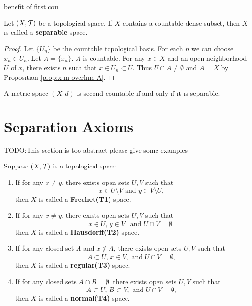 benefit of first cou

\begin{definition}[Separability]
    Let $(X,\mathcal{T})$ be a topological space. If $X$ contains a countable dense subset, then $X$ is called a \textbf{separable} space.
\end{definition}

\begin{theorem}
    
\end{theorem}
\begin{proof}
    Let $\{U_n\}$ be the countable topological basis. For each $n$ we can choose $x_n\in U_n$. Let $A=\{x_n\}$. $A$ is countable.
    For any $x\in X$ and an open neighborhood $U$ of $x$, there exists $n$ such that $x\in U_n\subset U$. Thus $U\cap A\neq \emptyset$ and $\overline{A}=X$ by Proposition \ref{prop:x in overline A}.
\end{proof}

\begin{proposition}
    A metric space $(X,d)$ is second countable if and only if it is separable.
\end{proposition}

\section{Separation Axioms}

TODO:This section is too abstract please give some examples

\begin{definition}
    Suppose $(X,\mathcal{T})$ is a topological space.
    \begin{enumerate}
        \item If for any $x\neq y$, there exists open sets $U,V$ such that $$x\in U\setminus V\text{ and } y\in V\setminus U,$$
        then $X$ is called a \textbf{Frechet(T1)} space.
        \item If for any $x\neq y$, there exists open sets $U,V$ such that $$x\in U,\, y\in V,\text{ and } U\cap V=\emptyset,$$
        then $X$ is called a \textbf{Hausdorff(T2)} space.
        \item If for any closed set $A$ and $x\notin A$, there exists open sets $U,V$ such that $$A\subset U,\, x\in V,\text{ and }U\cap V=\emptyset,$$
        then $X$ is called a \textbf{regular(T3)} space.
        \item If for any closed sets $A\cap B=\emptyset$, there exists open sets $U,V$ such that $$A\subset U,\,B\subset V,\text{ and }U\cap V=\emptyset,$$
        then $X$ is called a \textbf{normal(T4)} space.
    \end{enumerate}
\end{definition}

